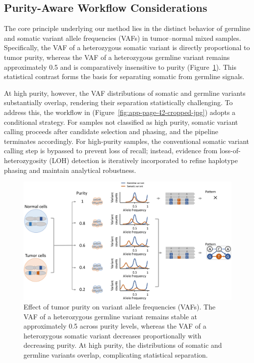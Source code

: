 \documentclass[pdflatex,sn-nature]{sn-jnl}
\def\pandocbounded#1{%
  \begingroup
  \setkeys{Gin}{width=1.0\linewidth,height=1.0\textheight,keepaspectratio}%
  #1%
  \endgroup
}
\begin{document}
\subsection{Purity-Aware Workflow Considerations}
\label{app:purity-aware-workflow}

The core principle underlying our method lies in the distinct behavior of germline and somatic variant allele frequencies (VAFs) in tumor--normal mixed samples. Specifically, the VAF of a heterozygous somatic variant is directly proportional to tumor purity, whereas the VAF of a heterozygous germline variant remains approximately 0.5 and is comparatively insensitive to purity (Figure~\ref{fig:app-page-41-cropped-jpg}). This statistical contrast forms the basis for separating somatic from germline signals.

At high purity, however, the VAF distributions of somatic and germline variants substantially overlap, rendering their separation statistically challenging. To address this, the workflow in (Figure~\ref{fig:app-page-42-cropped-jpg}) adopts a conditional strategy. For samples not classified as high purity, somatic variant calling proceeds after candidate selection and phasing, and the pipeline terminates accordingly. For high-purity samples, the conventional somatic variant calling step is bypassed to prevent loss of recall; instead, evidence from loss-of-heterozygosity (LOH) detection is iteratively incorporated to refine haplotype phasing and maintain analytical robustness.

\begin{figure}
\centering
\pandocbounded{\includegraphics[keepaspectratio]{page_41_cropped.jpg}}
\caption[Tumor Purity Effect on Allele Frequencies]{Effect of tumor purity on variant allele frequencies (VAFs). The VAF of a heterozygous germline variant remains stable at approximately 0.5 across purity levels, whereas the VAF of a heterozygous somatic variant decreases proportionally with decreasing purity. At high purity, the distributions of somatic and germline variants overlap, complicating statistical separation.}\label{fig:app-page-41-cropped-jpg}
\end{figure}
\end{document}
